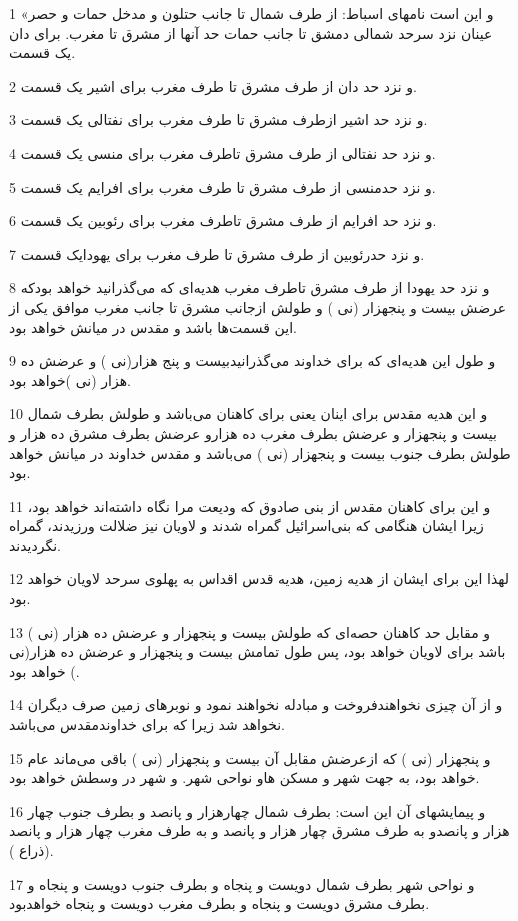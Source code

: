 \par 1 «و این است نامهای اسباط: از طرف شمال تا جانب حتلون و مدخل حمات و حصر عینان نزد سرحد شمالی دمشق تا جانب حمات حد آنها از مشرق تا مغرب. برای دان یک قسمت.
\par 2 و نزد حد دان از طرف مشرق تا طرف مغرب برای اشیر یک قسمت.
\par 3 و نزد حد اشیر ازطرف مشرق تا طرف مغرب برای نفتالی یک قسمت.
\par 4 و نزد حد نفتالی از طرف مشرق تاطرف مغرب برای منسی یک قسمت.
\par 5 و نزد حدمنسی از طرف مشرق تا طرف مغرب برای افرایم یک قسمت.
\par 6 و نزد حد افرایم از طرف مشرق تاطرف مغرب برای رئوبین یک قسمت.
\par 7 و نزد حدرئوبین از طرف مشرق تا طرف مغرب برای یهودایک قسمت.
\par 8 و نزد حد یهودا از طرف مشرق تاطرف مغرب هدیه‌ای که می‌گذرانید خواهد بودکه عرضش بیست و پنجهزار (نی ) و طولش ازجانب مشرق تا جانب مغرب موافق یکی از این قسمت‌ها باشد و مقدس در میانش خواهد بود.
\par 9 و طول این هدیه‌ای که برای خداوند می‌گذرانیدبیست و پنج هزار(نی ) و عرضش ده هزار (نی )خواهد بود.
\par 10 و این هدیه مقدس برای اینان یعنی برای کاهنان می‌باشد و طولش بطرف شمال بیست و پنجهزار و عرضش بطرف مغرب ده هزارو عرضش بطرف مشرق ده هزار و طولش بطرف جنوب بیست و پنجهزار (نی ) می‌باشد و مقدس خداوند در میانش خواهد بود.
\par 11 و این برای کاهنان مقدس از بنی صادوق که ودیعت مرا نگاه داشته‌اند خواهد بود، زیرا ایشان هنگامی که بنی‌اسرائیل گمراه شدند و لاویان نیز ضلالت ورزیدند، گمراه نگردیدند.
\par 12 لهذا این برای ایشان از هدیه زمین، هدیه قدس اقداس به پهلوی سرحد لاویان خواهد بود.
\par 13 و مقابل حد کاهنان حصه‌ای که طولش بیست و پنجهزار و عرضش ده هزار (نی ) باشد برای لاویان خواهد بود، پس طول تمامش بیست و پنجهزار و عرضش ده هزار(نی ) خواهد بود.
\par 14 و از آن چیزی نخواهندفروخت و مبادله نخواهند نمود و نوبرهای زمین صرف دیگران نخواهد شد زیرا که برای خداوندمقدس می‌باشد.
\par 15 و پنجهزار (نی ) که ازعرضش مقابل آن بیست و پنجهزار (نی ) باقی می‌ماند عام خواهد بود، به جهت شهر و مسکن هاو نواحی شهر. و شهر در وسطش خواهد بود.
\par 16 و پیمایشهای آن این است: بطرف شمال چهارهزار و پانصد و بطرف جنوب چهار هزار و پانصدو به طرف مشرق چهار هزار و پانصد و به طرف مغرب چهار هزار و پانصد (ذراع ).
\par 17 و نواحی شهر بطرف شمال دویست و پنجاه و بطرف جنوب دویست و پنجاه و بطرف مشرق دویست و پنجاه و بطرف مغرب دویست و پنجاه خواهدبود.
